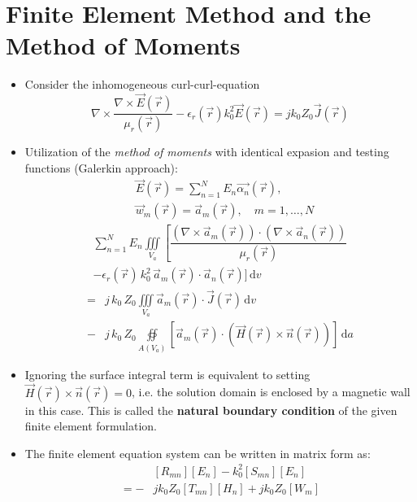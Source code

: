 \section{Finite Element Method and the Method of Moments}
\begin{itemize}
  \item Consider the inhomogeneous curl-curl-equation
        \begin{equation*}
          \nabla\times\dfrac{\nabla\times\vec{E}(\vec{r})}{\mu_{r}(\vec{r})} - \epsilon_{r}(\vec{r})k_{0}^{2}\vec{E}(\vec{r}) = jk_{0}Z_{0}\vec{J}(\vec{r})
        \end{equation*}
  \item Utilization of the \textit{method of moments} with identical expasion and testing functions (Galerkin approach):
        \begin{align*}
          &\vec{E}(\vec{r}) = \sum\limits_{n=1}^{N}E_{n}\vec{\alpha_{n}}(\vec{r}),\\
          &\vec{w}_{m}(\vec{r}) = \vec{a}_{m}(\vec{r}), \quad m=1,\dots,N
        \end{align*}
        \begin{align*}
          \sum\limits_{n=1}^{N}E_{n}\iiint\limits_{V_{a}}\left[\dfrac{(\nabla\times\vec{a}_{m}(\vec{r}))\cdot(\nabla\times\vec{a}_{n}(\vec{r}))}{\mu_{r}(\vec{r})}\right.\\
          - \epsilon_{r}(\vec{r})\,k_{0}^{2}\,\vec{a}_{m}(\vec{r})\cdot\vec{a}_{n}(\vec{r})\bigg]\,\mathrm{d}v
        \end{align*}
        \vspace{-5mm}
        \begin{align*}
          = &j\,k_{0}\,Z_{0} \iiint\limits_{V_{a}}\vec{a}_{m}(\vec{r})\cdot\vec{J}(\vec{r})\,\mathrm{d}v\\
          - &j\,k_{0}\,Z_{0} \oiint\limits_{A(V_{a})}\left[\vec{a}_{m}(\vec{r})\cdot(\vec{H}(\vec{r})\times\vec{n}(\vec{r}))\right]\,\mathrm{d}a
        \end{align*}
  \item Ignoring the surface integral term is equivalent to setting $\vec{H}(\vec{r})\times\vec{n}(\vec{r}) = 0$, i.e. the solution domain is enclosed by a magnetic wall in this case. This is called the \textbf{natural boundary condition} of the given finite element formulation.
  \item The finite element equation system can be written in matrix form as:
        \begin{align*}
          &[R_{mn}][E_{n}] - k_{0}^{2}[S_{mn}][E_{n}]\\
          = -&jk_{0}Z_{0}[T_{mn}][H_{n}] + jk_{0}Z_{0}[W_{m}]
        \end{align*}
\end{itemize}
